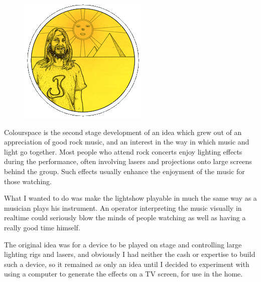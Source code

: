 \begin{definition}
\setlength{\intextsep}{0pt}%
\setlength{\columnsep}{3pt}%
\begin{figure}
\includegraphics[width=\linewidth]{src/callout/psych.png} 
\end{figure}
\small
Colourspace is the second stage development of an idea which grew out of an
appreciation of good rock music, and an interest in the way in which music and
light go together.  Most people who attend rock concerts enjoy lighting effects
during the performance, often involving lasers and projections onto large
screens behind the group.  Such effects usually enhance the enjoyment of the
music for those watching.

What I wanted to do was make the lightshow playable in much the same way as a
musician plays his instrument.  An operator interpreting the music visually in
realtime could seriously blow the minds of people watching as well as having a
really good time himself.

The original idea was for a device to be played on stage and controlling large
lighting rigs and lasers, and obviously I had neither the cash or expertise to
build such a device, so it remained as only an idea until I decided to
experiment with using a computer to generate the effects on a TV screen, for
use in the home.
\end{definition}

